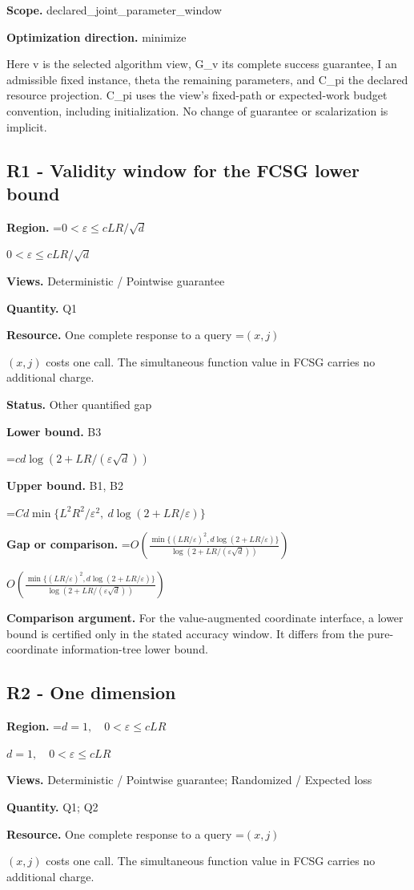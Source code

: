 \documentclass[10pt,a4paper]{article}
\newcommand{\AtlasMath}[1]{\par\begingroup\centering\setbox0=\hbox{$\displaystyle #1$}\ifdim\wd0>1.4\linewidth\typeout{ATLAS WIDE FORMULA: \the\wd0}\fi\ifdim\wd0>\linewidth\resizebox{\linewidth}{!}{\box0}\else\box0\fi\par\endgroup}
\newcommand{\AtlasInlineMath}[1]{\begingroup\setbox0=\hbox{$#1$}\ifdim\wd0>.4\linewidth\endgroup\AtlasMath{#1}\else\endgroup$#1$\fi}
\begin{document}
\textbf{Scope.} declared\_joint\_parameter\_window

\textbf{Optimization direction.} minimize

Here v is the selected algorithm view, G\_v its complete success guarantee, I an admissible fixed instance, theta the remaining parameters, and C\_pi the declared resource projection. C\_pi uses the view's fixed-path or expected-work budget convention, including initialization. No change of guarantee or scalarization is implicit.

\subsection{R1 - Validity window for the FCSG lower bound}
\textbf{Region.} \AtlasInlineMath{0<\varepsilon\le cLR/\sqrt d}

\textbf{Views.} Deterministic / Pointwise guarantee

\textbf{Quantity.} Q1

\textbf{Resource.} One complete response to a query \AtlasInlineMath{(x,j)} costs one call. The simultaneous function value in FCSG carries no additional charge.

\textbf{Status.} Other quantified gap

\textbf{Lower bound.} B3

\AtlasMath{cd\log(2+LR/(\varepsilon\sqrt d))}
\textbf{Upper bound.} B1, B2

\AtlasMath{Cd\min\{L^2R^2/\varepsilon^2,\ d\log(2+LR/\varepsilon)\}}
\textbf{Gap or comparison.} \AtlasInlineMath{O\!\left(\frac{\min\{(LR/\varepsilon)^2,d\log(2+LR/\varepsilon)\}}{\log(2+LR/(\varepsilon\sqrt d))}\right)}

\textbf{Comparison argument.} For the value-augmented coordinate interface, a lower bound is certified only in the stated accuracy window. It differs from the pure-coordinate information-tree lower bound.

\subsection{R2 - One dimension}
\textbf{Region.} \AtlasInlineMath{d=1,\quad0<\varepsilon\le cLR}

\textbf{Views.} Deterministic / Pointwise guarantee; Randomized / Expected loss

\textbf{Quantity.} Q1; Q2

\textbf{Resource.} One complete response to a query \AtlasInlineMath{(x,j)} costs one call. The simultaneous function value in FCSG carries no additional charge.
\end{document}
